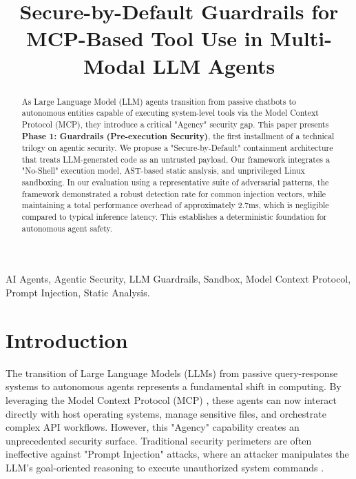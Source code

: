 \documentclass[conference]{IEEEtran}
\begin{document}
\title{Secure-by-Default Guardrails for MCP-Based Tool Use in Multi-Modal LLM Agents}

\author{
}

\maketitle

\begin{abstract}
As Large Language Model (LLM) agents transition from passive chatbots to autonomous entities capable of executing system-level tools via the Model Context Protocol (MCP), they introduce a critical "Agency" security gap. This paper presents \textbf{Phase 1: Guardrails (Pre-execution Security)}, the first installment of a technical trilogy on agentic security. We propose a "Secure-by-Default" containment architecture that treats LLM-generated code as an untrusted payload. Our framework integrates a "No-Shell" execution model, AST-based static analysis, and unprivileged Linux sandboxing. In our evaluation using a representative suite of adversarial patterns, the framework demonstrated a robust detection rate for common injection vectors, while maintaining a total performance overhead of approximately 2.7ms, which is negligible compared to typical inference latency. This establishes a deterministic foundation for autonomous agent safety.
\end{abstract}

\begin{IEEEkeywords}
AI Agents, Agentic Security, LLM Guardrails, Sandbox, Model Context Protocol, Prompt Injection, Static Analysis.
\end{IEEEkeywords}

\section{Introduction}
The transition of Large Language Models (LLMs) from passive query-response systems to autonomous agents represents a fundamental shift in computing. By leveraging the Model Context Protocol (MCP) \cite{mcp2024}, these agents can now interact directly with host operating systems, manage sensitive files, and orchestrate complex API workflows. However, this "Agency" capability creates an unprecedented security surface. Traditional security perimeters are often ineffective against "Prompt Injection" attacks, where an attacker manipulates the LLM's goal-oriented reasoning to execute unauthorized system commands \cite{perez2022ignore}.
\end{document}
